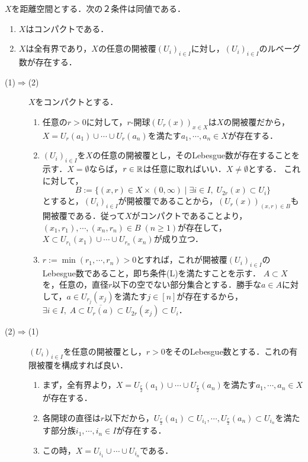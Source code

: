 \documentclass[uplatex,dvipdfmx]{jsreport}
\begin{document}
\begin{proposition}[距離空間がコンパクトであることの特徴付け]\label{prop-距離空間がコンパクトであることの特徴付け}
    $X$を距離空間とする．次の２条件は同値である．
    \begin{enumerate}
        \item $X$はコンパクトである．
        \item $X$は全有界であり，$X$の任意の開被覆$(U_i)_{i\in I}$に対し，$(U_i)_{i\in I}$のルベーグ数が存在する．
    \end{enumerate}
\end{proposition}
\begin{Proof}\mbox{}
    \begin{description}
        \item[(1)$\Rightarrow$(2)] $X$をコンパクトとする．
        \begin{enumerate}
            \item 任意の$r>0$に対して，$r$-開球$(U_r(x))_{x\in X}$は$X$の開被覆だから，$X=U_r(a_1)\cup\cdots\cup U_r(a_n)$を満たす$a_1,\cdots,a_n\in X$が存在する．
            \item $(U_i)_{i\in I}$を$X$の任意の開被覆とし，そのLebesgue数が存在することを示す．$X=\emptyset$ならば，$r\in\mathbb{R}$は任意に取ればいい．$X\ne\emptyset$とする．
            これに対して，\[B:=\{(x,r)\in X\times(0,\infty)\mid \exists i\in I,\;U_{2r}(x)\subset U_i\}\]
            とすると，$(U_i)_{i\in I}$が開被覆であることから，$(U_r(x))_{(x,r)\in B}$も開被覆である．従って$X$がコンパクトであることより，$(x_1,r_1),\cdots,(x_n,r_n)\in B\;(n\ge 1)$が存在して，$X\subset U_{r_1}(x_1)\cup\cdots\cup U_{r_n}(x_n)$が成り立つ．
            \item $r:=\min(r_1,\cdots,r_n)>0$とすれば，これが開被覆$(U_i)_{i\in I}$のLebesgue数であること，即ち条件(L)を満たすことを示す．
            $A\subset X$を，任意の，直径$r$以下の空でない部分集合とする．勝手な$a\in A$に対して，$a\in U_{r_j}(x_j)$を満たす$j\in[n]$が存在するから，$\exists i\in I,\;A\subset\overline{U_r(a)}\subset U_{2r}(x_j)\subset U_i$．
        \end{enumerate}
        \item[(2)$\Rightarrow$(1)]
        $(U_i)_{i\in I}$を任意の開被覆とし，$r>0$をそのLebesgue数とする．これの有限被覆を構成すれば良い．
        \begin{enumerate}
            \item まず，全有界より，$X=U_{\frac{r}{2}}(a_1)\cup\cdots\cup U_{\frac{r}{2}}(a_n)$を満たす$a_1,\cdots,a_n\in X$が存在する．
            \item 各開球の直径は$r$以下だから，$U_{\frac{r}{2}}(a_1)\subset U_{i_1},\cdots,U_{\frac{r}{2}}(a_n)\subset U_{i_n}$を満たす部分族$i_1,\cdots,i_n\in I$が存在する．
            \item この時，$X=U_{i_1}\cup\cdots\cup U_{i_n}$である．
        \end{enumerate}
    \end{description}
\end{Proof}
\end{document}
